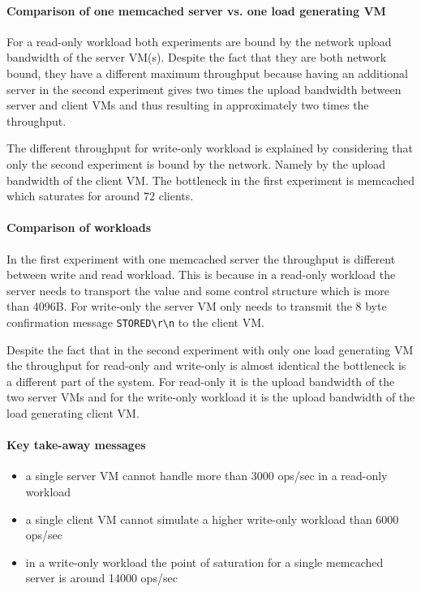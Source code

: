 \documentclass[11pt,a4paper]{article}
\begin{document}
\paragraph{Comparison of one memcached server vs. one load generating VM}
For a read-only workload both experiments are bound by the network upload bandwidth of the server VM(s).
Despite the fact that they are both network bound, they have a different maximum throughput because having an additional server in the second experiment gives two times the upload bandwidth between server and client VMs and thus resulting in approximately two times the throughput.

The different throughput for write-only workload is explained by considering that only the second experiment is bound by the network. Namely by the upload bandwidth of the client VM. The bottleneck in the first experiment is memcached which saturates for around 72 clients.

\paragraph{Comparison of workloads}
In the first experiment with one memcached server the throughput is different between write and read workload. This is because in a read-only workload the server needs to transport the value and some control structure which is more than 4096B. For write-only the server VM only needs to transmit the 8 byte confirmation message \texttt{STORED\textbackslash r\textbackslash n} to the client VM. 

Despite the fact that in the second experiment with only one load generating VM the throughput for read-only and write-only is almost identical the bottleneck is a different part of the system. For read-only it is the upload bandwidth of the two server VMs and for the write-only workload it is the upload bandwidth of the load generating client VM.

\paragraph{Key take-away messages}
\begin{itemize}
	\item a single server VM cannot handle more than 3000 ops/sec in a read-only workload
	\item a single client VM cannot simulate a higher write-only workload than 6000 ops/sec
	\item in a write-only workload the point of saturation for a single memcached server is around 14000 ops/sec
\end{itemize}
\end{document}
